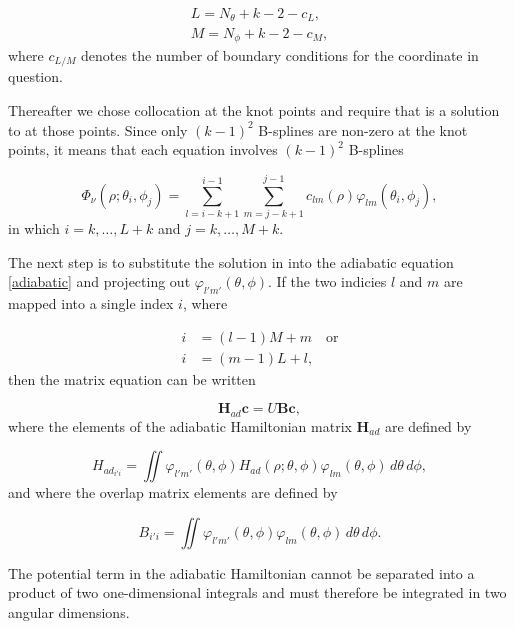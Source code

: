 \begin{align}
L = N_{\theta}+k-2-c_L,\\
M = N_{\phi}+k-2-c_M,
\end{align}
where $c_{L/M}$ denotes the number of boundary conditions for the coordinate in question.

Thereafter we chose collocation at the knot points and require that  is a solution to  at those points. Since only $(k-1)^2$ B-splines are non-zero at the knot points, it means that each equation involves $(k-1)^2$ B-splines

\begin{equation}
\Phi_{\nu}(\rho;\theta_i,\phi_j) = \sum_{l=i-k+1}^{i-1}\sum_{m=j-k+1}^{j-1} c_{lm}(\rho)\varphi_{lm} (\theta_{i},\phi_{j}),
\end{equation}
in which $i = k,\ldots,L+k$ and $j = k,\ldots,M+k$.

The next step is to substitute the solution in  into the adiabatic equation \eqref{adiabatic} and projecting out $\varphi_{l'm'}(\theta,\phi)$. If the two indicies $l$ and $m$ are mapped into a single index $i$, where

\begin{equation}
\begin{aligned}
i &= (l-1)M+m \quad \text{or}\\
i &= (m-1)L+l,
\end{aligned}
\end{equation} 
then the matrix equation can be written

\begin{equation}\label{generalized}
\mathbf{H}_{ad}\mathbf{c} = U\mathbf{B}\mathbf{c},
\end{equation}
where the elements of the adiabatic Hamiltonian matrix $\mathbf{H}_{ad}$ are defined by

\begin{equation}\label{ham_mat}
H_{ad_{i'i}} = \iint \varphi_{l'm'}(\theta,\phi) H_{ad}(\rho;\theta,\phi)\varphi_{lm}(\theta,\phi) \,d\theta\,d\phi,
\end{equation}
and where the overlap matrix elements are defined by

\begin{equation}\label{over_mat}
B_{i'i} = \iint \varphi_{l'm'}(\theta,\phi)\varphi_{lm}(\theta,\phi)\,d\theta\,d\phi.
\end{equation}

The potential term in the adiabatic Hamiltonian cannot be separated into a product of two one-dimensional integrals and must therefore be integrated in two angular dimensions. 

